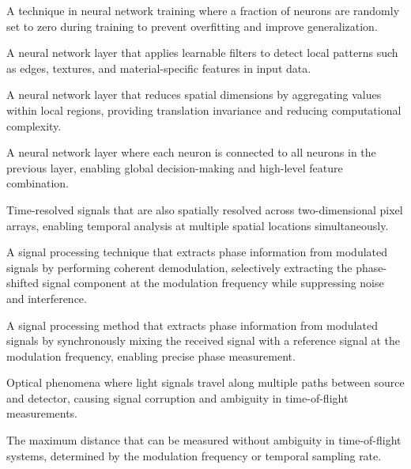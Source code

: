 \documentclass[12pt,a4paper,oneside]{report}
\begin{document}
{\begin{description}[leftmargin=3cm, style=nextline, itemsep=0pt, parsep=0pt, topsep=0pt, partopsep=0pt]
    \item[Dropout regularisation] A technique in neural network training where a fraction of neurons are randomly set to zero during training to prevent overfitting and improve generalization.
    
    \item[Convolutional layer] A neural network layer that applies learnable filters to detect local patterns such as edges, textures, and material-specific features in input data.
    
    \item[Pooling layer] A neural network layer that reduces spatial dimensions by aggregating values within local regions, providing translation invariance and reducing computational complexity.
    
    \item[Fully connected layer] A neural network layer where each neuron is connected to all neurons in the previous layer, enabling global decision-making and high-level feature combination.
    
    \item[Space Resolved Temporal Measurements (SRTM)] Time-resolved signals that are also spatially resolved across two-dimensional pixel arrays, enabling temporal analysis at multiple spatial locations simultaneously.
    
    \item[Lock-in amplification] A signal processing technique that extracts phase information from modulated signals by performing coherent demodulation, selectively extracting the phase-shifted signal component at the modulation frequency while suppressing noise and interference.
    
    \item[Coherent demodulation] A signal processing method that extracts phase information from modulated signals by synchronously mixing the received signal with a reference signal at the modulation frequency, enabling precise phase measurement.
    
    \item[Multi-path reflections] Optical phenomena where light signals travel along multiple paths between source and detector, causing signal corruption and ambiguity in time-of-flight measurements.
    
    \item[Unambiguous range] The maximum distance that can be measured without ambiguity in time-of-flight systems, determined by the modulation frequency or temporal sampling rate.
    

\end{description}}
\end{document}
